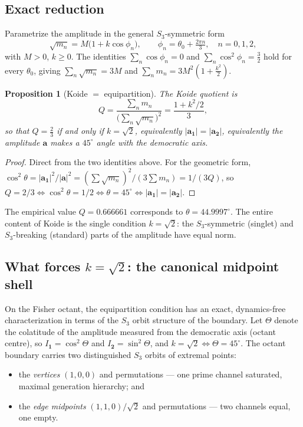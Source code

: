 \documentclass[12pt]{article}
\newtheorem{proposition}[theorem]{Proposition}
\theoremstyle{definition}
\theoremstyle{remark}
\begin{document}
\subsection{Exact reduction}

Parametrize the amplitude in the general $S_3$-symmetric form
\begin{equation}
\sqrt{m_n}=M\bigl(1+k\cos\phi_n\bigr),\qquad
\phi_n=\theta_0+\tfrac{2\pi n}{3},\quad n=0,1,2,
\label{eq:foot}
\end{equation}
with $M>0$, $k\ge0$. The identities $\sum_n\cos\phi_n=0$ and
$\sum_n\cos^2\phi_n=\tfrac32$ hold for every $\theta_0$, giving
$\sum_n\sqrt{m_n}=3M$ and $\sum_n m_n=3M^2(1+\tfrac{k^2}{2})$.

\begin{proposition}[Koide $=$ equipartition]
\label{prop:koide}
The Koide quotient is
\begin{equation}
Q=\frac{\sum_n m_n}{\bigl(\sum_n\sqrt{m_n}\bigr)^2}=\frac{1+k^2/2}{3},
\end{equation}
so that $Q=\tfrac23$ if and only if $k=\sqrt2$, equivalently
$|\boldsymbol a_{\mathbf 1}|=|\boldsymbol a_{\mathbf 2}|$, equivalently the
amplitude $\boldsymbol a$ makes a $45^\circ$ angle with the democratic axis.
\end{proposition}

\begin{proof}
Direct from the two identities above. For the geometric form,
$\cos^2\theta=|\boldsymbol a_{\mathbf 1}|^2/|\boldsymbol a|^2
=(\sum\sqrt{m_n})^2/(3\sum m_n)=1/(3Q)$, so $Q=2/3\Leftrightarrow
\cos^2\theta=1/2\Leftrightarrow\theta=45^\circ\Leftrightarrow
|\boldsymbol a_{\mathbf 1}|=|\boldsymbol a_{\mathbf 2}|$.
\end{proof}

The empirical value $Q=0.666661$ corresponds to $\theta=44.9997^\circ$. The
entire content of Koide is the single condition $k=\sqrt2$: the
$S_3$-symmetric (singlet) and $S_3$-breaking (standard) parts of the amplitude
have equal norm.

\subsection{What forces $k=\sqrt2$: the canonical midpoint shell}

On the Fisher octant, the equipartition condition has an exact, dynamics-free
characterization in terms of the $S_3$ orbit structure of the boundary. Let
$\Theta$ denote the colatitude of the amplitude measured from the democratic
axis (octant centre), so $I_{\mathbf 1}=\cos^2\Theta$ and
$I_{\mathbf 2}=\sin^2\Theta$, and $k=\sqrt2\Leftrightarrow\Theta=45^\circ$. The
octant boundary carries two distinguished $S_3$ orbits of extremal points:
\begin{itemize}
\item the \emph{vertices} $(1,0,0)$ and permutations --- one prime channel
saturated, maximal generation hierarchy; and
\item the \emph{edge midpoints} $(1,1,0)/\sqrt2$ and permutations --- two
channels equal, one empty.
\end{itemize}
\end{document}

